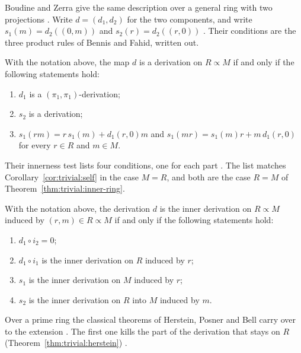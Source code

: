 Boudine and Zerra give the same description over a general ring with two
projections \cite[p.~461]{BoudineZerra2024}. Write $d=(d_{1},d_{2})$ for the
two components, and write $s_{1}(m)=d_{2}((0,m))$ and $s_{2}(r)=d_{2}((r,0))$
\cite[p.~461]{BoudineZerra2024}. Their conditions are the three product rules
of Bennis and Fahid, written out.

\begin{theorem}\label{thm:trivial:components}
With the notation above, the map $d$ is a derivation on $R\propto M$ if and only if
the following statements hold:
\begin{enumerate}[label=(\arabic*)]
\item $d_{1}$ is a $(\pi_{1},\pi_{1})$-derivation;
\item $s_{2}$ is a derivation;
\item $s_{1}(rm)=r\,s_{1}(m)+d_{1}(r,0)m$ and $s_{1}(mr)=s_{1}(m)r+m\,d_{1}(r,0)$
for every $r\in R$ and $m\in M$.
\end{enumerate}
\end{theorem}

Their innerness test lists four conditions, one for each part
\cite[p.~463]{BoudineZerra2024}. The list matches
Corollary~\ref{cor:trivial:self} in the case $M=R$, and both are the case
$R=M$ of Theorem~\ref{thm:trivial:inner-ring}.

\begin{theorem}\label{thm:trivial:inner-ring}
With the notation above, the derivation $d$ is the inner derivation on
$R\propto M$ induced by $(r,m)\in R\propto M$ if and only if the following
statements hold:
\begin{enumerate}[label=(\arabic*)]
\item $d_{1}\circ i_{2}=0$;
\item $d_{1}\circ i_{1}$ is the inner derivation on $R$ induced by $r$;
\item $s_{1}$ is the inner derivation on $M$ induced by $r$;
\item $s_{2}$ is the inner derivation on $R$ into $M$ induced by $m$.
\end{enumerate}
\end{theorem}

Over a prime ring the classical theorems of Herstein, Posner and Bell carry
over to the extension \cite[p.~467]{BoudineZerra2024}. The first one kills the
part of the derivation that stays on $R$ (Theorem~\ref{thm:trivial:herstein})
\cite[p.~467]{BoudineZerra2024}.

